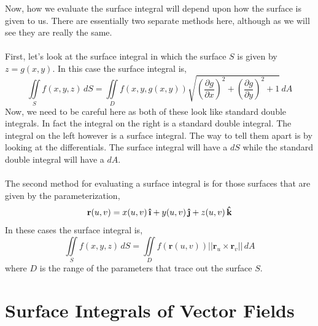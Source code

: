 \documentclass[10pt,reqno]{book}
\theoremstyle{definition}
\renewcommand{\vec}[1]{\mathbf{#1}}
\newcommand{\uvec}[1]{\boldsymbol{\hat{\textbf{#1}}}}
\begin{document}
	Now, how we evaluate the surface integral will depend upon how the surface is given to us. There are essentially two separate methods here, although as we will see they are really the same. \\ \\
	First, let's look at the surface integral in which the surface $ S $ is given by $ z = g(x,y) $. In this case the surface integral is,
	\[ \iint\limits_{S} f(x,y,z)\,dS = \iint\limits_D f(x,y,g(x,y)) \sqrt{\left( \frac{\partial g}{\partial x} \right)^2 + \left( \frac{\partial g}{\partial y} \right)^2 + 1}\,dA \]
	Now, we need to be careful here as both of these look like standard double integrals. In fact the integral on the right is a standard double integral. The integral on the left however is a surface integral. The way to tell them apart is by looking at the differentials. The surface integral will have a $ dS $ while the standard double integral will have a $ dA $. \\ \\
	The second method for evaluating a surface integral is for those surfaces that are given by the parameterization,
	\[ \vec{r}(u,v) = x(u,v)\,\uvec{\i} + y(u,v)\,\uvec{\j} + z(u,v)\,\uvec{k} \]
	In these cases the surface integral is,
	\[ \iint\limits_{S} f(x,y,z)\,dS = \iint\limits_D f(\vec{r}(u,v)) || \vec{r}_u \times \vec{r}_v ||\,dA \]
	where $ D $ is the range of the parameters that trace out the surface $ S $.
	
	\section{Surface Integrals of Vector Fields}
	
\end{document}
